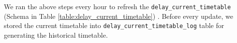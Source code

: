 \par We ran the above steps every hour to refresh the \texttt{delay\_current\_timetable} (Schema in Table \ref{table:delay_current_timetable}) . Before every update, we stored the current timetable into \texttt{delay\_current\_timetable\_log} table for generating the historical timetable.






